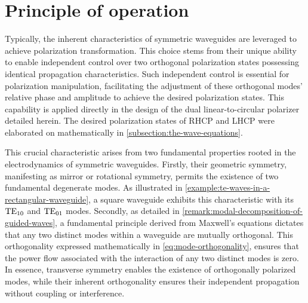 \documentclass[11pt,a4paper,twoside,openany]{report}
\begin{document}
\section{Principle of operation}
Typically, the inherent characteristics of symmetric waveguides are leveraged to achieve polarization transformation. This choice stems from their unique ability to enable independent control over two orthogonal polarization states possessing identical propagation characteristics. Such independent control is essential for polarization manipulation, facilitating the adjustment of these orthogonal modes' relative phase and amplitude to achieve the desired polarization states. This capability is applied directly in the design of the dual linear-to-circular polarizer detailed herein. The desired polarization states of RHCP and LHCP were elaborated on mathematically in \cref{subsection:the-wave-equations}.

This crucial characteristic arises from two fundamental properties rooted in the electrodynamics of symmetric waveguides. Firstly, their geometric symmetry, manifesting as mirror or rotational symmetry, permits the existence of two fundamental degenerate modes. As illustrated in \cref{example:te-waves-in-a-rectangular-waveguide}, a square waveguide exhibits this characteristic with its $\text{TE}_{10}$ and $\text{TE}_{01}$ modes. Secondly, as detailed in \cref{remark:modal-decomposition-of-guided-waves}, a fundamental principle derived from Maxwell's equations dictates that any two distinct modes within a waveguide are mutually orthogonal. This orthogonality expressed mathematically in \cref{eq:mode-orthogonality}, ensures that the power flow associated with the interaction of any two distinct modes is zero. In essence, transverse symmetry enables the existence of orthogonally polarized modes, while their inherent orthogonality ensures their independent propagation without coupling or interference.
\end{document}
